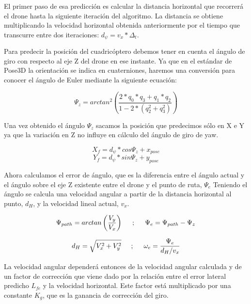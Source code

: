 \hspace{1cm} El primer paso de esa predicción es calcular la distancia horizontal que recorrerá el drone hasta la siguiente iteración del algoritmo. La distancia se obtiene multiplicando la velocidad horizontal obtenida anteriormente por el tiempo que transcurre entre dos iteraciones: \(d_{\psi} = v_{x} * \Delta_{t}\).

\hspace{1cm} Para predecir la posición del cuadricóptero debemos tener en cuenta el ángulo de giro con respecto al eje Z del drone en ese instante. Ya que en el estándar de Pose3D la orientación se indica en cuaterniones, haremos una conversión para conocer el ángulo de Euler mediante la siguiente ecuación:

\[ \Psi_{z} = arctan^{2}\left( \frac{2*q_{0}*q_{3}+q_{1}*q_{2}}{1-2*(q_{2}^{2}+q_{3}^{2})}\right) \]
 
\hspace{1cm} Una vez obtenido el ángulo $\Psi_{z}$ sacamos la posición que predecimos sólo en X e Y ya que la variación en Z no influye en cálculo del ángulo de giro de yaw.

\[ X_{f} = d_{\psi} * cos \Psi_{z} + x_{pose} \] 
\[ Y_{f} = d_{\psi} * sin \Psi_{z} + y_{pose} \]

\hspace{1cm} Ahora calculamos el error de ángulo, que es la diferencia entre el ángulo actual y el ángulo sobre el eje Z existente entre el drone y el punto de ruta, $\Psi_{e}$ Teniendo el ángulo se calcula una velocidad angular a partir de la distancia horizontal al punto, $d_{H}$, y la velocidad lineal actual, $v_{x}$.
 
\[\Psi_{path} = arctan \left(\frac{V_{y}}{V_{x}}\right)  \hspace{0.5cm};\hspace{0.5cm}\Psi_{e} = \Psi_{path} - \Psi_{z} \]

\[d_{H} = \sqrt{V_{x}^{2} + V_{y}^{2}} \hspace{0.5cm};\hspace{0.5cm} \omega_{e} =  \dfrac{\Psi_{e}}{d_{H}/v_{x}}\]

\hspace{1cm} La velocidad angular dependerá entonces de la velocidad angular calculada y de un factor de corrección que viene dado por la relación entre el error lateral predicho $L_{fe}$ y la velocidad horizontal. Este factor está multiplicado por una constante $K_{g}$, que es la ganancia de corrección del giro.

